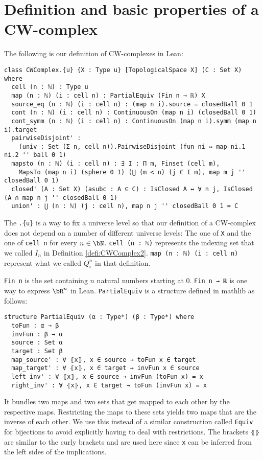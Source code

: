 \section{Definition and basic properties of a CW-complex}

The following is our definition of CW-complexes in Lean:

\begin{lstlisting}
class CWComplex.{u} {X : Type u} [TopologicalSpace X] (C : Set X) where
  cell (n : ℕ) : Type u
  map (n : ℕ) (i : cell n) : PartialEquiv (Fin n → ℝ) X
  source_eq (n : ℕ) (i : cell n) : (map n i).source = closedBall 0 1
  cont (n : ℕ) (i : cell n) : ContinuousOn (map n i) (closedBall 0 1)
  cont_symm (n : ℕ) (i : cell n) : ContinuousOn (map n i).symm (map n i).target
  pairwiseDisjoint' :
    (univ : Set (Σ n, cell n)).PairwiseDisjoint (fun ni ↦ map ni.1 ni.2 '' ball 0 1)
  mapsto (n : ℕ) (i : cell n) : ∃ I : Π m, Finset (cell m),
    MapsTo (map n i) (sphere 0 1) (⋃ (m < n) (j ∈ I m), map m j '' closedBall 0 1)
  closed' (A : Set X) (asubc : A ⊆ C) : IsClosed A ↔ ∀ n j, IsClosed (A ∩ map n j '' closedBall 0 1)
  union' : ⋃ (n : ℕ) (j : cell n), map n j '' closedBall 0 1 = C
\end{lstlisting}

The \lstinline|.{u}| is a way to fix a universe level so that our definition of a CW-complex does not depend on a number of different universe levels: The one of \lstinline{X} and the one of \lstinline{cell n} for every $n \in \bN$.
\lstinline{cell (n : ℕ)} represents the indexing set that we called $I_n$ in Definition \ref{defi:CWComplex2}. \lstinline{map (n : ℕ) (i : cell n)} represent what we called $Q_i^n$ in that definition. 

\lstinline{Fin n} is the set containing $n$ natural numbers starting at 0. 
\lstinline{Fin n → ℝ} is one way to express $\bR^n$ in Lean. 
\lstinline{PartialEquiv} is a structure defined in mathlib as follows: 

\begin{lstlisting}
structure PartialEquiv (α : Type*) (β : Type*) where
  toFun : α → β
  invFun : β → α
  source : Set α
  target : Set β
  map_source' : ∀ ⦃x⦄, x ∈ source → toFun x ∈ target
  map_target' : ∀ ⦃x⦄, x ∈ target → invFun x ∈ source
  left_inv' : ∀ ⦃x⦄, x ∈ source → invFun (toFun x) = x
  right_inv' : ∀ ⦃x⦄, x ∈ target → toFun (invFun x) = x
\end{lstlisting}

It bundles two maps and two sets that get mapped to each other by the respective maps. 
Restricting the maps to these sets yields two maps that are the inverse of each other. 
We use this instead of a similar construction called \lstinline{Equiv} for bijections to avoid explicitly having to deal with restrictions. 
The brackets \lstinline{⦃⦄} are similar to the curly brackets and are used here since \lstinline{x} can be inferred from the left sides of the implications.

